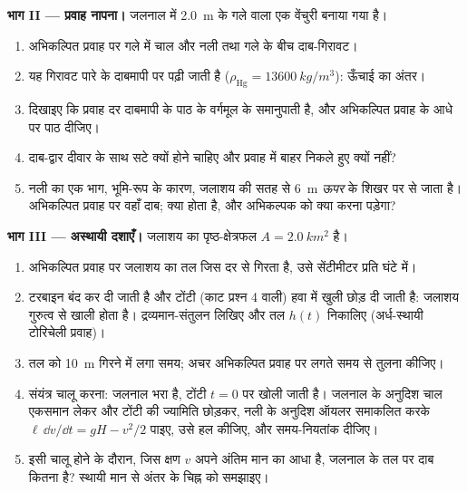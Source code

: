\begin{problem}
\medskip
\noindent\textbf{भाग II --- प्रवाह नापना।}
जलनाल में \qty{2.0}{m} के गले वाला एक वेंचुरी बनाया गया है।
\begin{enumerate}[resume]
  \item अभिकल्पित प्रवाह पर गले में चाल और नली तथा गले के बीच
        दाब-गिरावट।
  \item यह गिरावट पारे के दाबमापी पर पढ़ी जाती है ($\rho_{\text{Hg}} =
        \qty{13600}{kg/m^3}$): ऊँचाई का अंतर।
  \item दिखाइए कि प्रवाह दर दाबमापी के पाठ के वर्गमूल के
        समानुपाती है, और अभिकल्पित प्रवाह के आधे पर पाठ
        दीजिए।
  \item दाब-द्वार दीवार के साथ सटे क्यों होने चाहिए और प्रवाह में
        बाहर निकले हुए क्यों नहीं?
  \item नली का एक भाग, भूमि-रूप के कारण, जलाशय की सतह से \qty{6}{m}
        \emph{ऊपर} के शिखर पर से जाता है। अभिकल्पित प्रवाह पर वहाँ दाब;
        क्या होता है, और अभिकल्पक को क्या करना पड़ेगा?
\end{enumerate}

\medskip
\noindent\textbf{भाग III --- अस्थायी दशाएँ।}
जलाशय का पृष्ठ-क्षेत्रफल $A = \qty{2.0}{km^2}$ है।
\begin{enumerate}[resume]
  \item अभिकल्पित प्रवाह पर जलाशय का तल जिस दर से गिरता है, उसे
        सेंटीमीटर प्रति घंटे में।
  \item टरबाइन बंद कर दी जाती है और टोंटी (काट प्रश्न 4 वाली)
        हवा में खुली छोड़ दी जाती है: जलाशय गुरुत्व से खाली होता है।
        द्रव्यमान-संतुलन लिखिए और तल $h(t)$ निकालिए (अर्ध-स्थायी
        टोरिचेली प्रवाह)।
  \item तल को \qty{10}{m} गिरने में लगा समय; अचर अभिकल्पित प्रवाह पर
        लगते समय से तुलना कीजिए।
  \item संयंत्र चालू करना: जलनाल भरा है, टोंटी $t = 0$ पर खोली जाती
        है। जलनाल के अनुदिश चाल एकसमान लेकर और टोंटी की ज्यामिति
        छोड़कर, नली के अनुदिश ऑयलर समाकलित करके
        $\ell\,\dd v/\dd t = gH - v^2/2$ पाइए, उसे हल कीजिए, और
        समय-नियतांक दीजिए।
  \item इसी चालू होने के दौरान, जिस क्षण $v$ अपने अंतिम मान का आधा
        है, जलनाल के तल पर दाब कितना है?
        स्थायी मान से अंतर के चिह्न को समझाइए।
\end{enumerate}


\end{problem}
